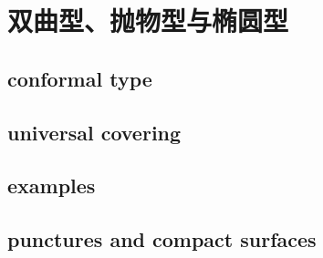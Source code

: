 \section{双曲型、抛物型与椭圆型}
\label{b3:sec:1203}


\subsection{conformal type}
\label{b3:subsec:120301}

\subsection{universal covering}
\label{b3:subsec:120302}

\subsection{examples}
\label{b3:subsec:120303}

\subsection{punctures and compact surfaces}
\label{b3:subsec:120304}


